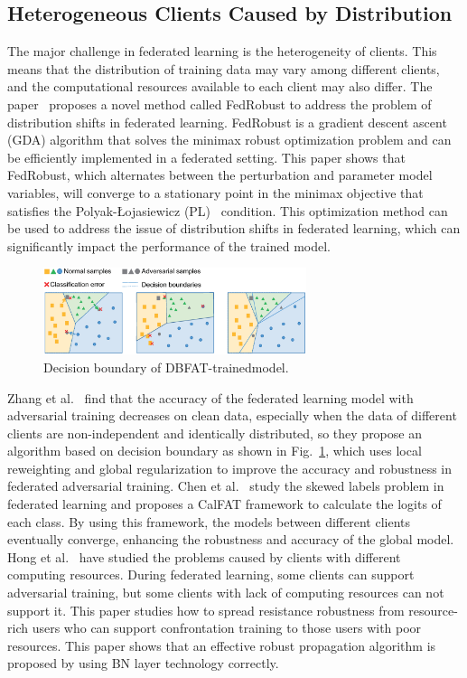 \subsection{Heterogeneous Clients Caused by Distribution}  
The major challenge in federated learning is the
heterogeneity of clients. This means that the distribution of
training data may vary among different clients, and the
computational resources available to each client may also
differ. The paper~\cite{reisizadeh2020robust} proposes a novel method called
FedRobust to address the problem of distribution shifts
in federated learning. FedRobust is a gradient descent
ascent (GDA) algorithm that solves the minimax robust
optimization problem and can be eﬀiciently implemented
in a federated setting. This paper shows that FedRobust,
which alternates between the perturbation and parameter
model variables, will converge to a stationary point in the
minimax objective that satisfies the Polyak-Łojasiewicz
(PL)~\cite{polyak1963gradient} condition. This optimization method can be
used to address the issue of distribution shifts in federated
learning, which can significantly impact the performance
of the trained model. 

\begin{figure}[h]
    \centering
    \includegraphics[width=1.0\linewidth,height=1.0in]{output/fig21.eps}
     \caption{Decision boundary of DBFAT-trainedmodel.}
     \label{fig21}
\end{figure}


Zhang et al.~\cite{zhang2023delving} find that the accuracy of the federated
learning model with adversarial training decreases on
clean data, especially when the data of different clients
are non-independent and identically distributed, so they
propose an algorithm based on decision boundary as
shown in Fig.~\ref{fig21}, which uses local reweighting and global
regularization to improve the accuracy and robustness in
federated adversarial training. Chen et al.~\cite{chen2022calfat} study the
skewed labels problem in federated learning and proposes
a CalFAT framework to calculate the logits of each class.
By using this framework, the models between different
clients eventually converge, enhancing the robustness and
accuracy of the global model.
Hong et al.~\cite{hong2021federated} have studied the problems caused
by clients with different computing resources. During
federated learning, some clients can support adversarial
training, but some clients with lack of computing resources
can not support it. This paper studies how to spread
resistance robustness from resource-rich users who can
support confrontation training to those users with poor
resources. This paper shows that an effective robust
propagation algorithm is proposed by using BN layer
technology correctly.

